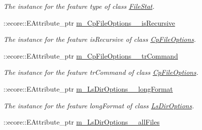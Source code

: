 \begin{DoxyCompactItemize}
\begin{DoxyCompactList}\small\item\em The instance for the feature type of class \hyperlink{classFMS__Data_1_1FileStat}{FileStat}. \item\end{DoxyCompactList}\item 
\hypertarget{classFMS__Data_1_1FMS__DataPackage_a89e7d2bf2730efa2e59b86201c4f3789}{
::ecore::EAttribute\_\-ptr \hyperlink{classFMS__Data_1_1FMS__DataPackage_a89e7d2bf2730efa2e59b86201c4f3789}{m\_\-CpFileOptions\_\-\_\-isRecursive}}
\label{classFMS__Data_1_1FMS__DataPackage_a89e7d2bf2730efa2e59b86201c4f3789}

\begin{DoxyCompactList}\small\item\em The instance for the feature isRecursive of class \hyperlink{classFMS__Data_1_1CpFileOptions}{CpFileOptions}. \item\end{DoxyCompactList}\item 
\hypertarget{classFMS__Data_1_1FMS__DataPackage_aa4ff4d1f14e6e9c6ffab103931eadc55}{
::ecore::EAttribute\_\-ptr \hyperlink{classFMS__Data_1_1FMS__DataPackage_aa4ff4d1f14e6e9c6ffab103931eadc55}{m\_\-CpFileOptions\_\-\_\-trCommand}}
\label{classFMS__Data_1_1FMS__DataPackage_aa4ff4d1f14e6e9c6ffab103931eadc55}

\begin{DoxyCompactList}\small\item\em The instance for the feature trCommand of class \hyperlink{classFMS__Data_1_1CpFileOptions}{CpFileOptions}. \item\end{DoxyCompactList}\item 
\hypertarget{classFMS__Data_1_1FMS__DataPackage_a72afa5939610ae64bfaf45b02488cf4f}{
::ecore::EAttribute\_\-ptr \hyperlink{classFMS__Data_1_1FMS__DataPackage_a72afa5939610ae64bfaf45b02488cf4f}{m\_\-LsDirOptions\_\-\_\-longFormat}}
\label{classFMS__Data_1_1FMS__DataPackage_a72afa5939610ae64bfaf45b02488cf4f}

\begin{DoxyCompactList}\small\item\em The instance for the feature longFormat of class \hyperlink{classFMS__Data_1_1LsDirOptions}{LsDirOptions}. \item\end{DoxyCompactList}\item 
\hypertarget{classFMS__Data_1_1FMS__DataPackage_a3756ade40b12f7dd9153bfaa9e5203e6}{
::ecore::EAttribute\_\-ptr \hyperlink{classFMS__Data_1_1FMS__DataPackage_a3756ade40b12f7dd9153bfaa9e5203e6}{m\_\-LsDirOptions\_\-\_\-allFiles}}
\label{classFMS__Data_1_1FMS__DataPackage_a3756ade40b12f7dd9153bfaa9e5203e6}


\end{DoxyCompactItemize}
